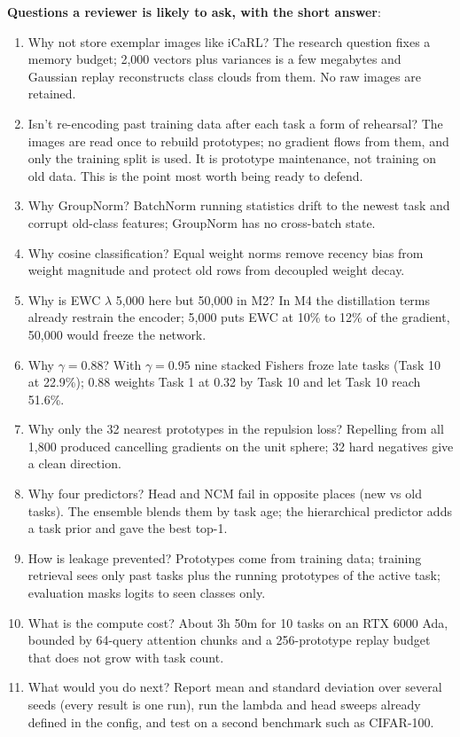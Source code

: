 \documentclass[11pt,a4paper]{article}
\begin{document}
\textbf{Questions a reviewer is likely to ask, with the short answer}:
\begin{enumerate}
  \item Why not store exemplar images like iCaRL? The research question fixes a memory budget; 2{,}000 vectors plus variances is a few megabytes and Gaussian replay reconstructs class clouds from them. No raw images are retained.
  \item Isn't re-encoding past training data after each task a form of rehearsal? The images are read once to rebuild prototypes; no gradient flows from them, and only the training split is used. It is prototype maintenance, not training on old data. This is the point most worth being ready to defend.
  \item Why GroupNorm? BatchNorm running statistics drift to the newest task and corrupt old-class features; GroupNorm has no cross-batch state.
  \item Why cosine classification? Equal weight norms remove recency bias from weight magnitude and protect old rows from decoupled weight decay.
  \item Why is EWC $\lambda$ 5{,}000 here but 50{,}000 in M2? In M4 the distillation terms already restrain the encoder; 5{,}000 puts EWC at 10\% to 12\% of the gradient, 50{,}000 would freeze the network.
  \item Why $\gamma = 0.88$? With $\gamma = 0.95$ nine stacked Fishers froze late tasks (Task 10 at 22.9\%); 0.88 weights Task 1 at 0.32 by Task 10 and let Task 10 reach 51.6\%.
  \item Why only the 32 nearest prototypes in the repulsion loss? Repelling from all 1{,}800 produced cancelling gradients on the unit sphere; 32 hard negatives give a clean direction.
  \item Why four predictors? Head and NCM fail in opposite places (new vs old tasks). The ensemble blends them by task age; the hierarchical predictor adds a task prior and gave the best top-1.
  \item How is leakage prevented? Prototypes come from training data; training retrieval sees only past tasks plus the running prototypes of the active task; evaluation masks logits to seen classes only.
  \item What is the compute cost? About 3h 50m for 10 tasks on an RTX 6000 Ada, bounded by 64-query attention chunks and a 256-prototype replay budget that does not grow with task count.
  \item What would you do next? Report mean and standard deviation over several seeds (every result is one run), run the lambda and head sweeps already defined in the config, and test on a second benchmark such as CIFAR-100.
\end{enumerate}
\end{document}
